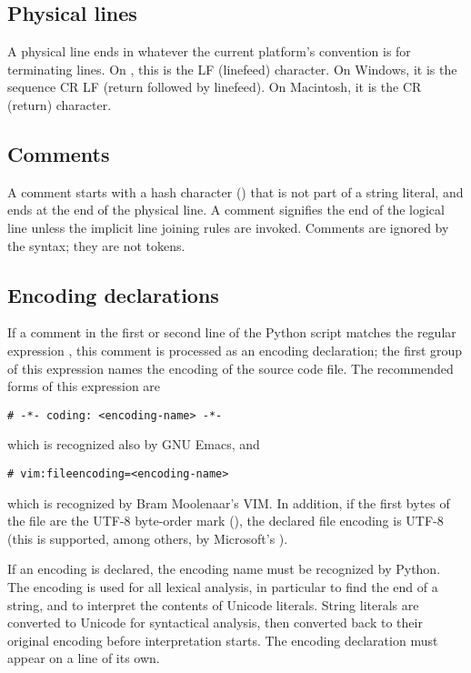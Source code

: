 \subsection{Physical lines\label{physical}}

A physical line ends in whatever the current platform's convention is
for terminating lines.  On \UNIX, this is the \ASCII{} LF (linefeed)
character.  On Windows, it is the \ASCII{} sequence CR LF (return
followed by linefeed).  On Macintosh, it is the \ASCII{} CR (return)
character.


\subsection{Comments\label{comments}}

A comment starts with a hash character (\code{\#}) that is not part of
a string literal, and ends at the end of the physical line.  A comment
signifies the end of the logical line unless the implicit line joining
rules are invoked.
Comments are ignored by the syntax; they are not tokens.


\subsection{Encoding declarations\label{encodings}}

If a comment in the first or second line of the Python script matches
the regular expression , this comment is
processed as an encoding declaration; the first group of this
expression names the encoding of the source code file. The recommended
forms of this expression are

\begin{verbatim}
# -*- coding: <encoding-name> -*-
\end{verbatim}

which is recognized also by GNU Emacs, and

\begin{verbatim}
# vim:fileencoding=<encoding-name>
\end{verbatim}

which is recognized by Bram Moolenaar's VIM. In addition, if the first
bytes of the file are the UTF-8 byte-order mark
(), the declared file encoding is UTF-8
(this is supported, among others, by Microsoft's ).

If an encoding is declared, the encoding name must be recognized by
Python. %
The encoding is used for all lexical analysis, in particular to find
the end of a string, and to interpret the contents of Unicode literals.
String literals are converted to Unicode for syntactical analysis,
then converted back to their original encoding before interpretation
starts. The encoding declaration must appear on a line of its own.

